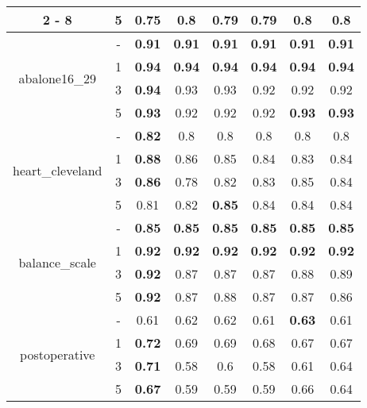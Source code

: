 \documentclass{article}%
\begin{document}
\begin{longtable}{c|c|cccccc}
\cline{2%
-%
8}%
&5&0.75&\textbf{0.8}&0.79&0.79&\textbf{0.8}&\textbf{0.8}\\%
\hline%
\multirow{4}{*}{abalone16\_29}&{-}&\textbf{0.91}&\textbf{0.91}&\textbf{0.91}&\textbf{0.91}&\textbf{0.91}&\textbf{0.91}\\%
\cline{2%
-%
8}%
&1&\textbf{0.94}&\textbf{0.94}&\textbf{0.94}&\textbf{0.94}&\textbf{0.94}&\textbf{0.94}\\%
\cline{2%
-%
8}%
&3&\textbf{0.94}&0.93&0.93&0.92&0.92&0.92\\%
\cline{2%
-%
8}%
&5&\textbf{0.93}&0.92&0.92&0.92&\textbf{0.93}&\textbf{0.93}\\%
\hline%
\multirow{4}{*}{heart\_cleveland}&{-}&\textbf{0.82}&0.8&0.8&0.8&0.8&0.8\\%
\cline{2%
-%
8}%
&1&\textbf{0.88}&0.86&0.85&0.84&0.83&0.84\\%
\cline{2%
-%
8}%
&3&\textbf{0.86}&0.78&0.82&0.83&0.85&0.84\\%
\cline{2%
-%
8}%
&5&0.81&0.82&\textbf{0.85}&0.84&0.84&0.84\\%
\hline%
\multirow{4}{*}{balance\_scale}&{-}&\textbf{0.85}&\textbf{0.85}&\textbf{0.85}&\textbf{0.85}&\textbf{0.85}&\textbf{0.85}\\%
\cline{2%
-%
8}%
&1&\textbf{0.92}&\textbf{0.92}&\textbf{0.92}&\textbf{0.92}&\textbf{0.92}&\textbf{0.92}\\%
\cline{2%
-%
8}%
&3&\textbf{0.92}&0.87&0.87&0.87&0.88&0.89\\%
\cline{2%
-%
8}%
&5&\textbf{0.92}&0.87&0.88&0.87&0.87&0.86\\%
\hline%
\multirow{4}{*}{postoperative}&{-}&0.61&0.62&0.62&0.61&\textbf{0.63}&0.61\\%
\cline{2%
-%
8}%
&1&\textbf{0.72}&0.69&0.69&0.68&0.67&0.67\\%
\cline{2%
-%
8}%
&3&\textbf{0.71}&0.58&0.6&0.58&0.61&0.64\\%
\cline{2%
-%
8}%
&5&\textbf{0.67}&0.59&0.59&0.59&0.66&0.64\\%
\hline%
\end{longtable}

%
\end{document}
